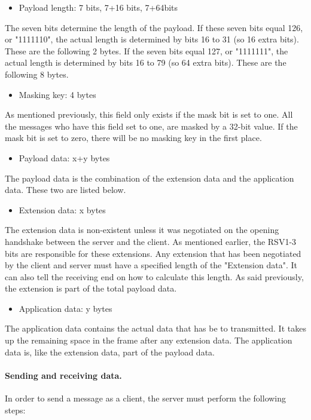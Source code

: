 \documentclass[a4paper, 11pt]{report}
\begin{document}
	\begin{itemize}
		\item {Payload length: 7 bits, 7+16 bits, 7+64bits}
	\end{itemize}
The seven bits determine the length of the payload. If these seven bits equal 126, or "1111110", the actual length is determined by bits 16 to 31 (so 16 extra bits). These are the following 2 bytes. If the seven bits equal 127, or "1111111", the actual length is determined by bits 16 to 79 (so 64 extra bits). These are the following 8 bytes.

	\begin{itemize}
		\item {Masking key: 4 bytes}
	\end{itemize}
As mentioned previously, this field only exists if the mask bit is set to one. All the messages who have this field set to one, are masked by a 32-bit value. If the mask bit is set to zero, there will be no masking key in the first place.

	\begin{itemize}
		\item{Payload data: x+y bytes}
	\end{itemize}
The payload data is the combination of the extension data and the application data. These two are listed below.

	\begin{itemize}
		\item{Extension data: x bytes}
	\end{itemize}
The extension data is non-existent unless it was negotiated on the opening handshake between the server and the client. As mentioned earlier, the RSV1-3 bits are responsible for these extensions. Any extension that has been negotiated by the client and server must have a specified length of the "Extension data". It can also tell the receiving end on how to calculate this length. As said previously, the extension is part of the total payload data.
	
	\begin{itemize}
		\item{Application data: y bytes}
	\end{itemize}
The application data contains the actual data that has be to transmitted. It takes up the remaining space in the frame after any extension data. The application data is, like the extension data, part of the payload data.

	\paragraph{Sending and receiving data.}
In order to send a message as a client, the server must perform the following steps:
\end{document}
